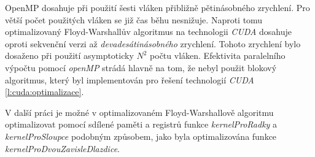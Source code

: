 OpenMP dosahuje při použití šesti vláken přibližně pětinásobného zrychlení. Pro větší počet použitých vláken se již čas běhu nesnižuje.
Naproti tomu optimalizovaný Floyd-Warshallův algoritmus na technologii \emph{CUDA} dosahuje oproti sekvenční verzi až \emph{devadesátinásobného} zrychlení. Tohoto zrychlení bylo dosaženo při použití asymptoticky $N^2$ počtu vláken. Efektivita paralelního výpočtu pomocí \emph{openMP} strádá hlavně na tom, že nebyl použit blokový algoritmus, který byl implementován pro řešení technologií \emph{CUDA} \ref{l:cuda:optimalizace}.

V další práci je možné v optimalizovaném Floyd-Warshallově algoritmu optimalizovat pomocí sdílené paměti a registrů funkce \emph{kernelProRadky} a \emph{kernelProSloupce} podobným způsobem, jako byla optimalizována funkce \emph{kernelProDvouZavisleDlazdice}.


\clearpage





